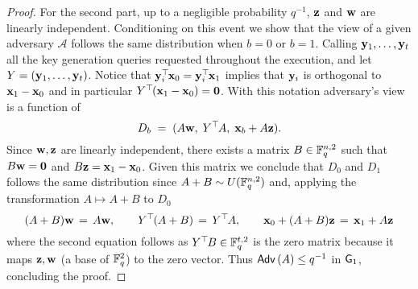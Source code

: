 \begin{proof}
	For the second part, up to a negligible probability $q^{-1}$, $\mathbf{z}$ and $\mathbf{w}$ are linearly independent.
	Conditioning on this event we show that the view of a given adversary $\mathcal{A}$ follows the same distribution when $b = 0$ or $b = 1$.
	Calling $\mathbf{y}_1, \ldots, \mathbf{y}_t$ all the key generation queries requested throughout the execution, and let $Y = (\mathbf{y}_1, \ldots, \mathbf{y}_t)$.
	Notice that $\mathbf{y}_i^\top\hspace{-.1em} \mathbf{x}_0 = \mathbf{y}_i^\top\hspace{-.1em} \mathbf{x}_1$ implies that $\mathbf{y}_i$ is orthogonal to $\mathbf{x}_1 - \mathbf{x}_0$ and in particular $Y^\top\hspace{-.1em}(\mathbf{x}_1 - \mathbf{x}_0) = \mathbf{0}$.
	With this notation adversary's view is a function of 
	\[
		D_b \; = \; (A\mathbf{w}, \; Y^\top\hspace{-.1em} A, \; \mathbf{x}_b + A \mathbf{z}).
	\]
	Since $\mathbf{w}, \mathbf{z}$ are linearly independent, there exists a matrix $B \in \mathbb{F}_q^{n, 2}$ such that $B \mathbf{w} = \mathbf{0}$ and $B \mathbf{z} = \mathbf{x}_1 - \mathbf{x}_0$.
	Given this matrix we conclude that $D_0$ and $D_1$ follows the same distribution since $A + B \sim U(\mathbb{F}_q^{n, 2})$ and, applying the transformation $A \mapsto A + B$ to $D_0$
	\[
		(A + B) \mathbf{w} 
			\, = \, 
		A \mathbf{w},
			\qquad
		Y^\top\hspace{-.1em}(A + B)
			\, = \,
		Y^\top\hspace{-.1em} A,
			\qquad
		\mathbf{x}_0 + (A + B) \mathbf{z}
			\, = \,
		\mathbf{x}_1 + A \mathbf{z}
	\]
	where the second equation follows as $Y^\top\hspace{-.1em} B \in \mathbb{F}_q^{t, 2}$ is the zero matrix because it maps $\mathbf{z}, \mathbf{w}$ (a base of $\mathbb{F}_q^2$) to the zero vector.
	Thus $\mathsf{Adv}\left(A\right) \leq q^{-1}$ in $\mathsf{G}_1$, concluding the proof.
\end{proof}

